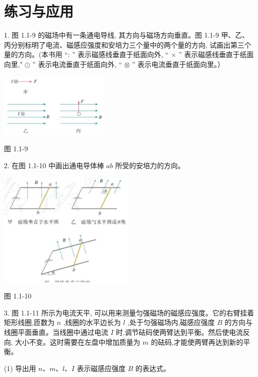 \documentclass[10pt]{article}
\begin{document}
\section*{练习与应用}

1. 图 1.1-9 的磁场中有一条通电导线, 其方向与磁场方向垂直。图 1.1-9 甲、乙、丙分别标明了电流、磁感应强度和安培力三个量中的两个量的方向, 试画出第三个量的方向。(本书用 “: ” 表示磁感线垂直于纸面向外, “ \(\times\) ” 表示磁感线垂直于纸面向里," \(\odot\) ” 表示电流垂直于纸面向外, “ \(\otimes\) ” 表示电流垂直于纸面向里。）

\begin{center}
\includegraphics[max width=0.4\textwidth]{images/01910e72-c5b7-7ed5-a6d4-fb3a5faefc32_11_234099.jpg}
\end{center}

图 1.1-9

2. 在图 1.1-10 中画出通电导体棒 \({ab}\) 所受的安培力的方向。

\begin{center}
\includegraphics[max width=0.5\textwidth]{images/01910e72-c5b7-7ed5-a6d4-fb3a5faefc32_11_951516.jpg}
\end{center}

图 1.1-10

3. 图 1.1-11 所示为电流天平, 可以用来测量匀强磁场的磁感应强度。它的右臂挂着矩形线圈,匝数为 \(n\) ,线圈的水平边长为 \(l\) ,处于匀强磁场内,磁感应强度 \(B\) 的方向与线圈平面垂直。当线圈中通过电流 \(I\) 时,调节砝码使两臂达到平衡。然后使电流反向, 大小不变。这时需要在左盘中增加质量为 \(m\) 的砝码,才能使两臂再达到新的平衡。

(1) 导出用 \(n\text{、}m\text{、}l\text{、}I\) 表示磁感应强度 \(B\) 的表达式。
\end{document}
